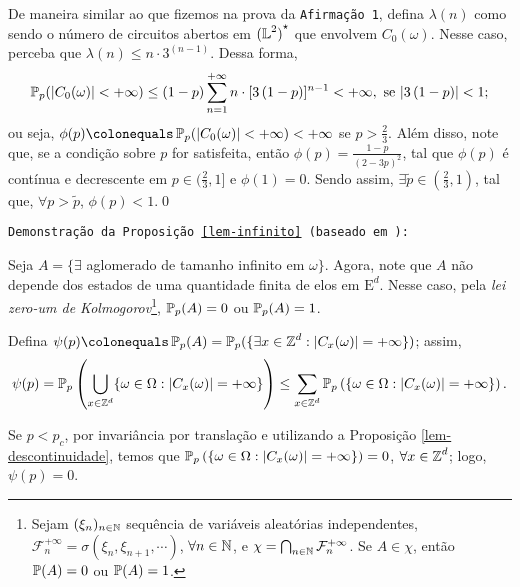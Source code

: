 \par De maneira similar ao que fizemos na prova da \texttt{Afirmação 1}, defina $\lambda(n)$ como sendo o número de circuitos abertos em ${(\operatorname{\mathbb{L}}^2)}^{\star}$ que envolvem $C_0(\omega)$. Nesse caso, perceba que $\lambda(n) \leq n \cdot 3^{(n-1)}$. Dessa forma,
\begin{align*}
	\operatorname{\mathbb{P}}_p(|C_0(\omega)| < +\infty) \leq (1 - p) \sum_{n = 1}^{+\infty} n \cdot [3 \, (1-p)]^{n-1} < +\infty, \text{ se } |3\,(1-p)| < 1;
\end{align*}
ou seja, $\phi(p) \colonequals \PX_p(|C_0(\omega)| < +\infty) < +\infty$ se $p > \frac{2}{3}$. Além disso, note que, se a condição sobre $p$ for satisfeita, então $\phi(p) = \frac{1-p}{(2-3p)^2}$, tal que $\phi(p)$ é contínua e decrescente em $p \in (\frac{2}{3}, 1]$ e $\phi(1) = 0$. Sendo assim, $\exists \tilde{p} \in (\frac{2}{3}, 1)$, tal que, $\forall p  > \tilde{p}$, $\phi(p) < 1$.\hspace{\fill}\qed

\vspace{12pt}

\par \texttt{Demonstração da Proposição \ref{lem-infinito} (baseado em \cite{grimmett1999percolation}):}

\par Seja $A = \{\exists$ aglomerado de tamanho infinito em $\omega\}$. Agora, note que $A$ não depende dos estados de uma quantidade finita de elos em $\text{E}^d$. Nesse caso, pela \textit{lei zero-um de Kolmogorov}\footnote{Sejam $(\xi_n)_{n \in \operatorname{\mathbb{N}}}$ sequência de variáveis aleatórias independentes, $\mathcal{F}^{+\infty}_n = \sigma(\xi_n, \xi_{n+1}, \cdots)$, $\forall n \in \operatorname{\mathbb{N}}$, e $\chi = \bigcap_{n \in \operatorname{\mathbb{N}}} \mathcal{F}^{+\infty}_n$. Se $A \in \chi$, então $\operatorname{\mathbb{P}}(A) = 0$ ou $\operatorname{\mathbb{P}}(A) = 1$.}, $\operatorname{\mathbb{P}}_p(A) = 0$ ou $\operatorname{\mathbb{P}}_p(A) = 1$.

\par Defina $\psi(p) \colonequals \PX_p(A) = \PX_p(\{\exists x \in \ZX^d : |C_x(\omega)| = +\infty\})$; assim,
\begin{align*}
	\psi(p) = \operatorname{\mathbb{P}}_p\left(\bigcup_{x \in \operatorname{\mathbb{Z}}^d}\{\omega \in \Omega: |C_x(\omega)| = +\infty\}\right) \leq \sum_{x \in \operatorname{\mathbb{Z}}^d}\operatorname{\mathbb{P}}_p\left(\{\omega \in \Omega: |C_x(\omega)| = +\infty\}\right).
\end{align*}
\par Se $p < p_c$, por invariância por translação e utilizando a Proposição \ref{lem-descontinuidade}, temos que $\operatorname{\mathbb{P}}_p\left(\{\omega \in \Omega: |C_x(\omega)| = +\infty\}\right) = 0$, $\forall x \in \operatorname{\mathbb{Z}}^d$; logo, $\psi(p) = 0$.


